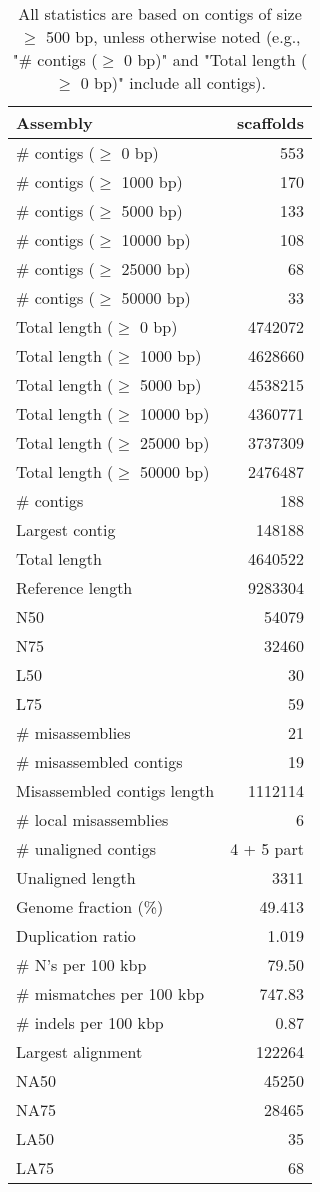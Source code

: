 \documentclass[12pt,a4paper]{article}
\begin{document}
\begin{table}[ht]
\begin{center}
\caption{All statistics are based on contigs of size $\geq$ 500 bp, unless otherwise noted (e.g., "\# contigs ($\geq$ 0 bp)" and "Total length ($\geq$ 0 bp)" include all contigs).}
\begin{tabular}{|l*{1}{|r}|}
\hline
Assembly & scaffolds \\ \hline
\# contigs ($\geq$ 0 bp) & 553 \\ \hline
\# contigs ($\geq$ 1000 bp) & 170 \\ \hline
\# contigs ($\geq$ 5000 bp) & 133 \\ \hline
\# contigs ($\geq$ 10000 bp) & 108 \\ \hline
\# contigs ($\geq$ 25000 bp) & 68 \\ \hline
\# contigs ($\geq$ 50000 bp) & 33 \\ \hline
Total length ($\geq$ 0 bp) & 4742072 \\ \hline
Total length ($\geq$ 1000 bp) & 4628660 \\ \hline
Total length ($\geq$ 5000 bp) & 4538215 \\ \hline
Total length ($\geq$ 10000 bp) & 4360771 \\ \hline
Total length ($\geq$ 25000 bp) & 3737309 \\ \hline
Total length ($\geq$ 50000 bp) & 2476487 \\ \hline
\# contigs & 188 \\ \hline
Largest contig & 148188 \\ \hline
Total length & 4640522 \\ \hline
Reference length & 9283304 \\ \hline
N50 & 54079 \\ \hline
N75 & 32460 \\ \hline
L50 & 30 \\ \hline
L75 & 59 \\ \hline
\# misassemblies & 21 \\ \hline
\# misassembled contigs & 19 \\ \hline
Misassembled contigs length & 1112114 \\ \hline
\# local misassemblies & 6 \\ \hline
\# unaligned contigs & 4 + 5 part \\ \hline
Unaligned length & 3311 \\ \hline
Genome fraction (\%) & 49.413 \\ \hline
Duplication ratio & 1.019 \\ \hline
\# N's per 100 kbp & 79.50 \\ \hline
\# mismatches per 100 kbp & 747.83 \\ \hline
\# indels per 100 kbp & 0.87 \\ \hline
Largest alignment & 122264 \\ \hline
NA50 & 45250 \\ \hline
NA75 & 28465 \\ \hline
LA50 & 35 \\ \hline
LA75 & 68 \\ \hline
\end{tabular}
\end{center}
\end{table}
\end{document}
